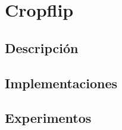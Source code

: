 \section{Cropflip}

\subsection{Descripción}

\subsection{Implementaciones}

\subsection{Experimentos}

